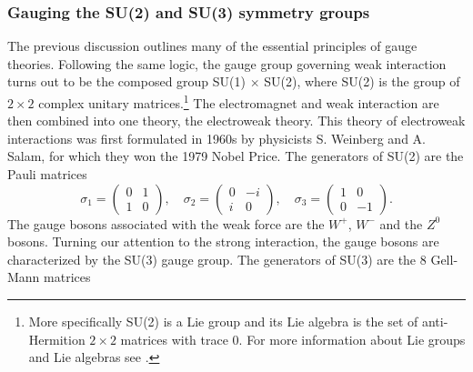 \subsubsection{Gauging the SU(2) and SU(3) symmetry groups} \label{sec:su2andsu3}
The previous discussion outlines many of the essential principles of gauge theories. Following the same logic, the gauge group governing weak interaction turns out to be the composed group SU(1) $\times$ SU(2), where SU(2) is the group of $2 \times 2$ complex unitary matrices.\footnote{More specifically SU(2) is a Lie group and its Lie algebra is the set of anti-Hermition $2 \times 2$ matrices with trace 0. For more information about Lie groups and Lie algebras see  \cite{fulton1991rtf}.} The electromagnet and weak interaction are then combined into one theory, the electroweak theory. This theory of electroweak interactions was first formulated in 1960s by physicists S. Weinberg and A. Salam, for which they won the 1979 Nobel Price. The generators of SU(2) are the Pauli matrices
\begin{equation}
	\sigma_1 =
	\begin{pmatrix}
	0&1\\
	1&0
	\end{pmatrix}, \quad
	\sigma_2 = 
	\begin{pmatrix}
	0&-i\\
	i&0
	\end{pmatrix}, \quad
	\sigma_3 = 
	\begin{pmatrix}
	1&0\\
	0&-1
	\end{pmatrix}.
\end{equation}
The gauge bosons associated with the weak force are the $W^+$, $W^-$ and the $Z^0$ bosons. Turning our attention to the strong interaction, the gauge bosons are characterized by the SU(3) gauge group. The generators of SU(3) are the 8 Gell-Mann matrices
